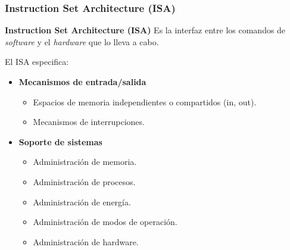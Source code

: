 \documentclass[aspectratio=169]{beamer}
\begin{document}
\begin{frame}[t,fragile]
    \frametitle{Instruction Set Architecture (ISA)}
    \begin{block}{\textbf{Instruction Set Architecture (ISA)}}
    Es la interfaz entre los comandos de \emph{software} y el \emph{hardware} que lo lleva a cabo.
    \end{block}
    El ISA especifica:
    \begin{itemize}
    \item<2-> \textbf{Mecanismos de entrada/salida}
    \begin{itemize}
     \item Espacios de memoria independientes o compartidos (in, out).
     \item Mecanismos de interrupciones.
    \end{itemize}
    \item<3-> \textbf{Soporte de sistemas}
    \begin{itemize}
     \item Administración de memoria.
     \item Administración de procesos.
     \item Administración de energía.
     \item Administración de modos de operación.
     \item Administración de hardware.
    \end{itemize}
    \end{itemize}
\end{frame}
\end{document}
